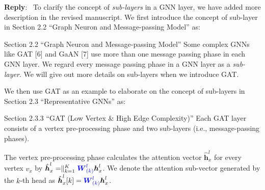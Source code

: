 \documentclass[12pt]{article}
\newcommand{\MyVec}[1]{\boldsymbol{#1}}
\newcommand{\MyMat}[1]{\boldsymbol{#1}}
\newcommand{\hvec}[1]{\hat{\boldsymbol{h}}_{#1}}
\newcommand{\Param}[1]{\textcolor{blue}{#1}}
\newenvironment{myquote}[1]%
{\vspace{0.5em}\begin{zitat}{#1}}
{\end{zitat}\vspace{0.5em}}
\newenvironment{reply}
   {\medskip \noindent \textbf{Reply}:\  }
   {\medskip}
\begin{document}
\begin{reply}
    To clarify the concept of \emph{sub-layers} in a GNN layer, we have added more description in the revised manuscript.
    We first introduce the concept of sub-layer in Section 2.2 ``Graph Neuron and Message-passing Model'' as:
    \begin{myquote}{Section 2.2 ``Graph Neuron and Message-passing Model''}
        Some complex GNNs like GAT [6] and GaAN [7] use more than one message passing phase in each GNN layer.
        We regard every message passing phase in a GNN layer as a \emph{sub-layer}.
        We will give out more details on sub-layers when we introduce GAT.
    \end{myquote}
    We then use GAT as an example to elaborate on the concept of sub-layers in Section 2.3 ``Representative GNNs'' as:
    \begin{myquote}{Section 2.3.3 ``GAT (Low Vertex \& High Edge Complexity)''}
        \newcommand{\GATCalcWeight}{\exp(LeakyReLU(\Param{\MyVec{a}}^T[\hvec{y}^l[k] \parallel \hvec{x}^l[k]]))}
        Each GAT layer consists of a vertex pre-processing phase and two sub-layers (i.e., message-passing phases).
        
        The vertex pre-processing phase calculates the attention vector $\hat{\boldsymbol{h}}^{l}_{x}$ for every vertex $v_x$ by $\hvec{x}^l = \parallel_{k=1}^K \Param{\MyMat{W}^l_{(k)}}\MyVec{h}^l_x$. We denote the attention sub-vector generated by the $k$-th head as $\hvec{x}^l[k]=\Param{\MyMat{W}^l_{(k)}}\MyVec{h}^l_x$.
        

\end{myquote}
\end{reply}
\end{document}
